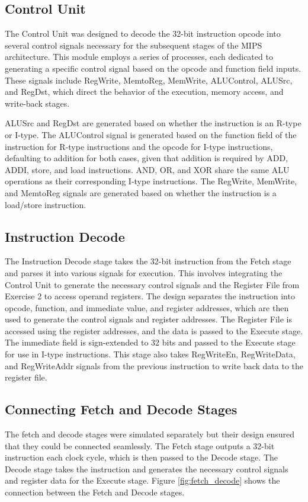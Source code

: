\documentclass[CMPE]{../KGCOEReport}
\begin{document}
\subsection*{Control Unit}
The Control Unit was designed to decode the 32-bit instruction opcode into several control signals necessary for the subsequent stages of the MIPS architecture. This module employs a series of processes, each dedicated to generating a specific control signal based on the opcode and function field inputs. These signals include RegWrite, MemtoReg, MemWrite, ALUControl, ALUSrc, and RegDst, which direct the behavior of the execution, memory access, and write-back stages.

ALUSrc and RegDst are generated based on whether the instruction is an R-type or I-type. The ALUControl signal is generated based on the function field of the instruction for R-type instructions and the opcode for I-type instructions, defaulting to addition for both cases, given that addition is required by ADD, ADDI, store, and load instructions. AND, OR, and XOR share the same ALU operations as their corresponding I-type instructions. The RegWrite, MemWrite, and MemtoReg signals are generated based on whether the instruction is a load/store instruction.

\subsection*{Instruction Decode}
The Instruction Decode stage takes the 32-bit instruction from the Fetch stage and parses it into various signals for execution. This involves integrating the Control Unit to generate the necessary control signals and the Register File from Exercise 2 to access operand registers. The design separates the instruction into opcode, function, and immediate value, and register addresses, which are then used to generate the control signals and register addresses. The Register File is accessed using the register addresses, and the data is passed to the Execute stage. The immediate field is sign-extended to 32 bits and passed to the Execute stage for use in I-type instructions. This stage also takes RegWriteEn, RegWriteData, and RegWriteAddr signals from the previous instruction to write back data to the register file.

\subsection*{Connecting Fetch and Decode Stages}
The fetch and decode stages were simulated separately but their design ensured that they could be connected seamlessly. The Fetch stage outputs a 32-bit instruction each clock cycle, which is then passed to the Decode stage. The Decode stage takes the instruction and generates the necessary control signals and register data for the Execute stage. Figure \ref{fig:fetch_decode} shows the connection between the Fetch and Decode stages.
\end{document}
